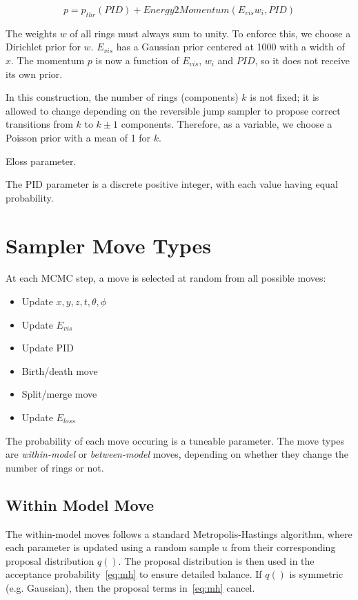\documentclass[11pt]{article} %
\begin{document}
\begin{equation}
p = p_{thr}(PID) + Energy2Momentum(E_{vis}w_{i}, PID)
\end{equation}

The weights $w$ of all rings must always sum to unity. To enforce this, we choose a Dirichlet prior for $w$. $E_{vis}$ has a Gaussian prior centered at 1000 with a width of $x$. The momentum $p$ is now a function of $E_{vis}$, $w_{i}$ and $PID$, so it does not receive its own prior.

In this construction, the number of rings (components) $k$ is not fixed; it is allowed to change depending on the reversible jump sampler to propose correct transitions from $k$ to $k\pm1$ components. Therefore, as a variable, we choose a Poisson prior with a mean of 1 for $k$.

Eloss parameter.

The PID parameter is a discrete positive integer, with each value having equal probability.

\section{Sampler Move Types}
At each MCMC step, a move is selected at random from all possible moves:

\begin{itemize}
\item Update $x,y,z,t,\theta,\phi$
\item Update $E_{vis}$
\item Update PID
\item Birth/death move
\item Split/merge move
\item Update $E_{loss}$
\end{itemize}

The probability of each move occuring is a tuneable parameter. The move types are \emph{within-model} or \emph{between-model} moves, depending on whether they change the number of rings or not.

\subsection{Within Model Move}
The within-model moves follows a standard Metropolis-Hastings algorithm, where each parameter is updated using a random sample $u$ from their corresponding proposal distribution $q()$. The proposal distribution is then used in the acceptance probability~\ref{eq:mh} to ensure detailed balance. If $q()$ is symmetric (e.g. Gaussian), then the proposal terms in~\ref{eq:mh} cancel. 
\end{document}
